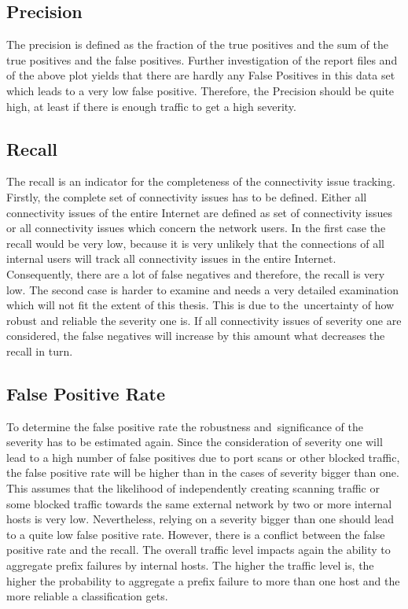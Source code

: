 \subsection{Precision}
The precision is defined as the fraction of the true positives and the sum of the true positives and the false positives. Further investigation of the report files and of the above plot yields that there are hardly any False Positives in this data set which leads to a very low false positive. Therefore, the Precision should be quite high, at least if there is enough traffic to get a high severity.

\subsection{Recall}
The recall is an indicator for the completeness of the connectivity issue tracking. Firstly, the complete set of connectivity issues has to be defined. Either all connectivity issues of the entire Internet are defined as set of connectivity issues or all connectivity issues which concern the network users. In the first case the recall would be very low, because it is very unlikely that the connections of all internal users will track all connectivity issues in the entire Internet. Consequently, there are a lot of false negatives and therefore, the recall is very low. The second case is harder to examine and needs a very detailed examination which will not fit the extent of this thesis. This is due to the uncertainty of how robust and reliable the severity one is. If all connectivity issues of severity one are considered, the false negatives will increase by this amount what decreases the recall in turn.

\subsection{False Positive Rate}
To determine the false positive rate the robustness and significance of the severity has to be estimated again. Since the consideration of severity one will lead to a high number of false positives due to port scans or other blocked traffic, the false positive rate will be higher than in the cases of severity bigger than one. This assumes that the likelihood of independently creating scanning traffic or some blocked traffic towards the same external network by two or more internal hosts is very low. Nevertheless, relying on a severity bigger than one should lead to a quite low false positive rate. However, there is a conflict between the false positive rate and the recall. The overall traffic level impacts again the ability to aggregate prefix failures by internal hosts. The higher the traffic level is, the higher the probability to aggregate a prefix failure to more than one host and the more reliable a classification gets.
